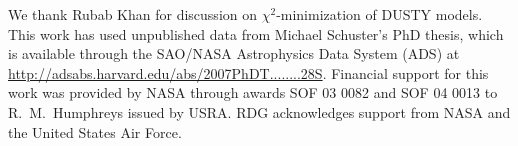 \documentclass[modern]{aastex61}
\begin{document}
\vspace{4mm}
We thank Rubab Khan for discussion on $\chi^2$-minimization of DUSTY models. This work has used unpublished data from Michael Schuster's PhD thesis, which is available through the SAO/NASA Astrophysics Data System (ADS) at \url{http://adsabs.harvard.edu/abs/2007PhDT........28S}. Financial support for this work was provided by NASA through awards SOF 03 0082 and SOF 04 0013 to R.~M.~Humphreys issued by USRA. RDG acknowledges support from NASA and the United States Air Force.




\figEnhanced
\figVXSgrSED
\figVXSgrRad
\figSPerSED
\figSPerRad
\figSPerRadMIRAC
\figRSPerSED
\figRSPerRad
\figTPerSED
\figTPerRad
\figTPerRadMIRAC
\figNMLCygSED
\figNMLCygRad
\figNMLCygRadMIRAC
\figMLR


\clearpage
\end{document}
